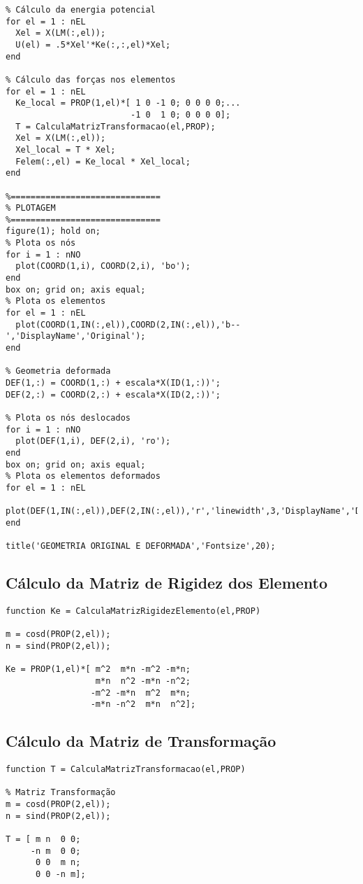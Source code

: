 \documentclass[deposito, acronym, symbols]{fei}
\begin{document}
\begin{lstlisting}
% Cálculo da energia potencial
for el = 1 : nEL
  Xel = X(LM(:,el));
  U(el) = .5*Xel'*Ke(:,:,el)*Xel;
end

% Cálculo das forças nos elementos
for el = 1 : nEL
  Ke_local = PROP(1,el)*[ 1 0 -1 0; 0 0 0 0;...
                         -1 0  1 0; 0 0 0 0];
  T = CalculaMatrizTransformacao(el,PROP);
  Xel = X(LM(:,el));
  Xel_local = T * Xel;
  Felem(:,el) = Ke_local * Xel_local;
end

%==============================
% PLOTAGEM
%==============================
figure(1); hold on;
% Plota os nós
for i = 1 : nNO
  plot(COORD(1,i), COORD(2,i), 'bo');
end
box on; grid on; axis equal;
% Plota os elementos
for el = 1 : nEL
  plot(COORD(1,IN(:,el)),COORD(2,IN(:,el)),'b--','DisplayName','Original');
end

% Geometria deformada
DEF(1,:) = COORD(1,:) + escala*X(ID(1,:))';
DEF(2,:) = COORD(2,:) + escala*X(ID(2,:))';

% Plota os nós deslocados
for i = 1 : nNO
  plot(DEF(1,i), DEF(2,i), 'ro');
end
box on; grid on; axis equal;
% Plota os elementos deformados
for el = 1 : nEL
  plot(DEF(1,IN(:,el)),DEF(2,IN(:,el)),'r','linewidth',3,'DisplayName','Deformada');
end

title('GEOMETRIA ORIGINAL E DEFORMADA','Fontsize',20);

\end{lstlisting}


\subsection{Cálculo da Matriz de Rigidez dos Elemento}

\begin{lstlisting}
function Ke = CalculaMatrizRigidezElemento(el,PROP)

m = cosd(PROP(2,el));
n = sind(PROP(2,el));

Ke = PROP(1,el)*[ m^2  m*n -m^2 -m*n;
                  m*n  n^2 -m*n -n^2;
                 -m^2 -m*n  m^2  m*n;
                 -m*n -n^2  m*n  n^2];
\end{lstlisting}


\subsection{Cálculo da Matriz de Transformação}

\begin{lstlisting}
function T = CalculaMatrizTransformacao(el,PROP)

% Matriz Transformação
m = cosd(PROP(2,el));
n = sind(PROP(2,el));

T = [ m n  0 0;
     -n m  0 0;
      0 0  m n;
      0 0 -n m];
      
\end{lstlisting}
\end{document}
